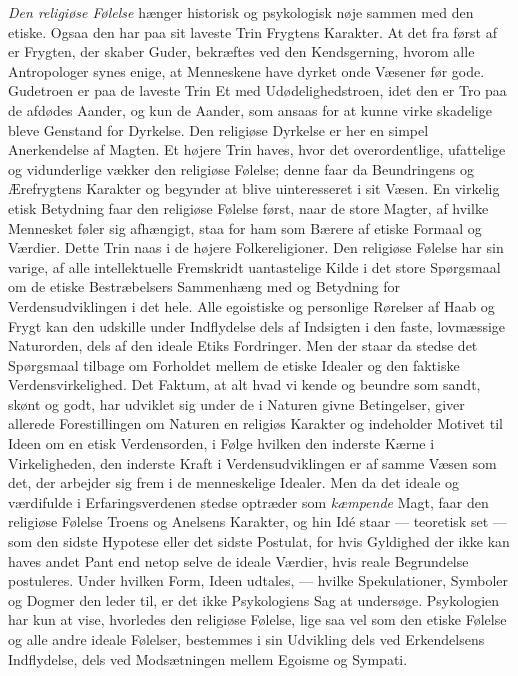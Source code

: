 \documentclass[12pt,a4paper,openany]{book}
\newcommand{\opage}[1]{\marginnote{\footnotesize\textit{[#1]}}}
\begin{document}
\emph{Den religiøse Følelse} hænger historisk og psykologisk nøje sammen
med den etiske. Ogsaa den har paa sit laveste Trin Frygtens Karakter. At
det fra først af er Frygten, der skaber Guder, bekræftes ved den
Kendsgerning, hvorom alle Antropologer synes enige, at Menneskene have
dyrket onde Væsener før gode. Gudetroen er paa de laveste Trin Et med
Udødelighedstroen, idet den er Tro paa de afdødes Aander, og kun de
Aander, som ansaas for at kunne virke skadelige bleve Genstand for
Dyrkelse. Den religiøse Dyrkelse er her en simpel Anerkendelse af
Magten. Et højere Trin haves, hvor det overordentlige, ufattelige og
vidunderlige vækker den religiøse Følelse; denne faar da Beundringens og
Ærefrygtens Karakter og begynder at blive uinteresseret i sit Væsen. En
virkelig etisk Betydning faar den religiøse Følelse først, naar de store
Magter, af hvilke Mennesket føler sig afhængigt, staa for ham som Bærere
af etiske Formaal og Værdier. Dette Trin naas i de højere
Folkereligioner. Den religiøse Følelse har sin varige, af alle
intellektuelle Fremskridt uantastelige Kilde i det store Spørgsmaal om
de etiske Bestræbelsers Sammenhæng med og Betydning for
Verdensudviklingen i det hele. Alle egoistiske og personlige Rørelser af
Haab og Frygt
\opage{313}kan den udskille under Indflydelse dels af Indsigten i den
faste, lovmæssige Naturorden, dels af den ideale Etiks Fordringer. Men
der staar da stedse det Spørgsmaal tilbage om Forholdet mellem de etiske
Idealer og den faktiske Verdensvirkelighed. Det Faktum, at alt hvad vi
kende og beundre som sandt, skønt og godt, har udviklet sig under de i
Naturen givne Betingelser, giver allerede Forestillingen om Naturen en
religiøs Karakter og indeholder Motivet til Ideen om en etisk
Verdensorden, i Følge hvilken den inderste Kærne i Virkeligheden, den
inderste Kraft i Verdensudviklingen er af samme Væsen som det, der
arbejder sig frem i de menneskelige Idealer. Men da det ideale og
værdifulde i Erfaringsverdenen stedse optræder som \emph{kæmpende} Magt,
faar den religiøse Følelse Troens og Anelsens Karakter, og hin Idé staar
--- teoretisk set --- som den sidste Hypotese eller det sidste Postulat,
for hvis Gyldighed der ikke kan haves andet Pant end netop selve de
ideale Værdier, hvis reale Begrundelse postuleres. Under hvilken Form,
Ideen udtales, --- hvilke Spekulationer, Symboler og Dogmer den leder
til, er det ikke Psykologiens Sag at undersøge. Psykologien har kun at
vise, hvorledes den religiøse Følelse, lige saa vel som den etiske
Følelse og alle andre ideale Følelser, bestemmes i sin Udvikling dels
ved Erkendelsens Indflydelse, dels ved Modsætningen mellem Egoisme og
Sympati.
\end{document}
